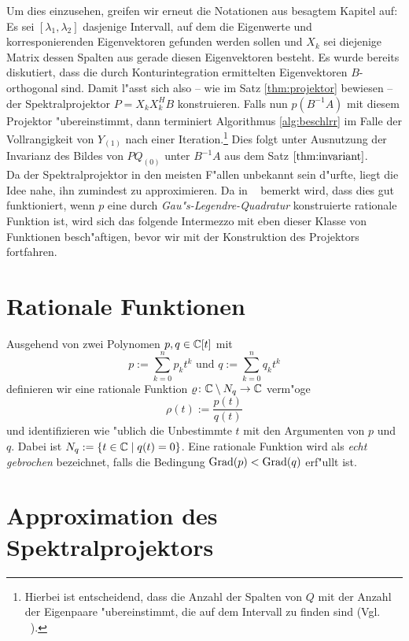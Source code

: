 Um dies einzusehen, greifen wir erneut die Notationen aus besagtem Kapitel auf:
Es sei $[\lambda_1, \lambda_2]$ dasjenige Intervall, auf dem die Eigenwerte und
korresponierenden Eigenvektoren gefunden werden sollen und $X_k$ sei diejenige
Matrix dessen Spalten aus gerade diesen Eigenvektoren besteht. Es wurde bereits
diskutiert, dass die durch Konturintegration ermittelten Eigenvektoren
$B$-orthogonal sind. Damit l"asst sich also -- wie im Satz \ref{thm:projektor}
bewiesen -- der Spektralprojektor $P = X_k X_k^H B$ konstruieren. Falls nun
$p(B^{-1}A)$ mit diesem Projektor "ubereinstimmt, dann terminiert Algorithmus
\ref{alg:beschlrr} im Falle der Vollrangigkeit von $Y_{(1)}$ nach einer Iteration.\footnote{
Hierbei ist entscheidend, dass die Anzahl der Spalten von $Q$ mit der Anzahl der
Eigenpaare "ubereinstimmt, die auf dem Intervall zu finden sind (Vgl. ~\cite[356]{ptep}).}
Dies folgt unter Ausnutzung der Invarianz des Bildes von $PQ_{(0)}$ unter $B^{-1}A$
aus dem Satz $\ref{thm:invariant}$.\\

Da der Spektralprojektor in den meisten F"allen unbekannt sein d"urfte, liegt
die Idee nahe, ihn zumindest zu approximieren. Da in ~\cite[356]{ptep} bemerkt wird,
dass dies gut funktioniert, wenn $p$ eine durch \emph{Gau"s-Legendre-Quadratur}
konstruierte rationale Funktion ist, wird sich das folgende Intermezzo mit eben dieser
Klasse von Funktionen besch"aftigen, bevor wir mit der Konstruktion des Projektors
fortfahren.


\section{Rationale Funktionen}

Ausgehend von zwei Polynomen $p, q\in\mathbb{C} [t]$ mit
\[
p := \sum_{k=0}^n p_k t^k \text{ \ und\ } q := \sum_{k=0}^n q_k t^k
\]
definieren wir eine rationale Funktion $\varrho\colon\mathbb{C}\setminus{N_q}\to\mathbb{C}$ verm"oge
\[
\rho(t) := \frac{p(t)}{q(t)}
\]
und identifizieren wie "ublich die Unbestimmte $t$ mit den Argumenten von $p$ und $q$.
Dabei ist $N_q := \{t\in\mathbb{C} \mid q(t) = 0\}$. Eine rationale Funktion wird als \emph{echt gebrochen} bezeichnet,
falls die Bedingung $\operatorname{Grad}(p) < \operatorname{Grad}(q)$ erf"ullt ist.



\section{Approximation des Spektralprojektors}

